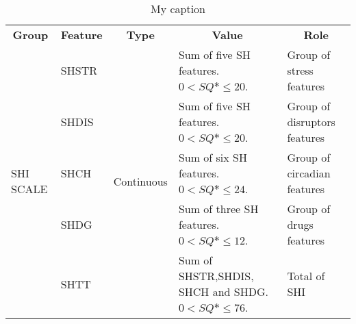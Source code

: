 \documentclass[10pt,letterpaper,oneside]{article}
\begin{document}
	\begin{table}[]
		\centering
		\caption{My caption}
		\label{my-label}
		\begin{tabular}{lllll}
			\multicolumn{1}{c}{\textbf{Group}} & \multicolumn{1}{c}{\textbf{Feature}} & \multicolumn{1}{c}{\textbf{Type}} & \multicolumn{1}{c}{\textbf{Value}}                     & \multicolumn{1}{c}{\textbf{Role}} \\
			\multirow{5}{*}{SHI SCALE}         & SHSTR                                & \multirow{5}{*}{Continuous}       & Sum of five SH features. $ 0 < SQ*\leq 20 $.           & Group of stress features          \\
			& SHDIS                                &                                   & Sum of five SH features. $ 0 < SQ*\leq 20 $.           & Group of disruptors features      \\
			& SHCH                                 &                                   & Sum of six SH features. $ 0 < SQ*\leq 24 $.            & Group of circadian features       \\
			& SHDG                                 &                                   & Sum of three SH features. $ 0 < SQ*\leq 12 $.          & Group of drugs features           \\
			& SHTT                                 &                                   & Sum of SHSTR,SHDIS, SHCH and SHDG. $ 0 < SQ*\leq 76 $. & Total of SHI                     
		\end{tabular}
	\end{table}
\end{document}
